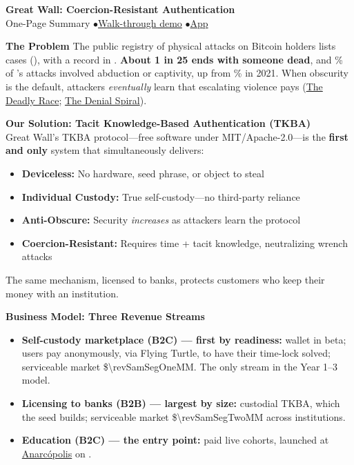 
\thispagestyle{empty}

\begin{center}
\Large\textbf{Great Wall: Coercion-Resistant Authentication}\\[0.3em]
{\small One-Page Summary \quad$\bullet$\quad \href{\demourl}{Walk-through demo} \quad$\bullet$\quad \href{\appurl}{App}}
\end{center}

\vfill

\noindent\textbf{The Problem}\quad
The public registry of physical attacks on Bitcoin holders lists \textbf{\attacksTotal} cases (\attacksAsOf), with a record \attacksRecordYearCount{} in \attacksRecordYear. \textbf{About 1 in 25 ends with someone dead}, and \attacksAbductNow\% of \attacksRecordYear's attacks involved abduction or captivity, up from \attacksAbductThen\% in 2021. When obscurity is the default, attackers \emph{eventually} learn that escalating violence pays (\href{\drurl}{The Deadly Race}; \href{\dsurl}{The Denial Spiral}).

\vfill

\noindent\textbf{Our Solution: Tacit Knowledge-Based Authentication (TKBA)}\\
Great Wall's TKBA protocol---free software under MIT/Apache-2.0---is the \textbf{first and only} system that simultaneously delivers:
\begin{itemize}[nosep,leftmargin=1.5em]
    \item \textbf{Deviceless:} No hardware, seed phrase, or object to steal
    \item \textbf{Individual Custody:} True self-custody---no third-party reliance
    \item \textbf{Anti-Obscure:} Security \textit{increases} as attackers learn the protocol
    \item \textbf{Coercion-Resistant:} Requires time + tacit knowledge, neutralizing wrench attacks
\end{itemize}
The same mechanism, licensed to banks, protects customers who keep their money with an institution.

\vfill

\noindent\textbf{Business Model: Three Revenue Streams}
\begin{itemize}[nosep,leftmargin=1.5em]
    \item \textbf{Self-custody marketplace (B2C) --- first by readiness:} wallet in beta; users pay anonymously, via Flying Turtle, to have their time-lock solved; serviceable market \$\num[round-precision=1]{\revSamSegOneM}M. The only stream in the Year 1--3 model.
    \item \textbf{Licensing to banks (B2B) --- largest by size:} custodial TKBA, which the seed builds; serviceable market \$\num[round-precision=1]{\revSamSegTwoM}M across \numint{\samSegTwoInstitutions} institutions.
    \item \textbf{Education (B2C) --- the entry point:} paid live cohorts, launched at \href{\anarcurl}{Anarcópolis} on \masterclassDate.
\end{itemize}

